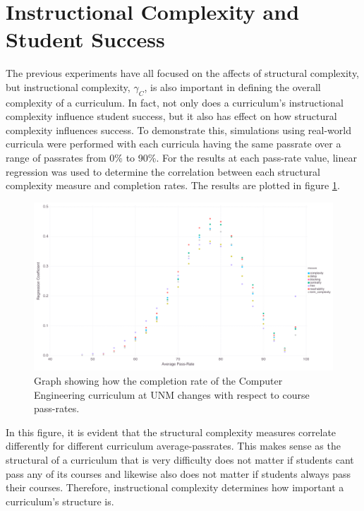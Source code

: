\documentclass[botnum, fleqn]{unmeethesis}
\begin{document}

  \section{Instructional Complexity and Student Success}
    The previous experiments have all focused on the affects of structural complexity, but instructional complexity, $\gamma_C$, is also important in defining the overall complexity of a curriculum. In fact, not only does a curriculum's instructional complexity influence student success, but it also has effect on how structural complexity influences success. To demonstrate this, simulations using real-world curricula were performed with each curricula having the same passrate over a range of passrates from 0\% to 90\%. For the results at each pass-rate value, linear regression was used to determine the correlation between each structural complexity measure and completion rates. The results are plotted in figure \ref{fig:coef}.

    \begin{figure}[h!]
      \centerline{\includegraphics[scale=0.2]{./figures/coef_gradRate10.png}}
      \caption{Graph showing how the completion rate of the Computer Engineering curriculum at UNM changes with respect to course pass-rates.} 
      \label{fig:coef}
    \end{figure}

    In this figure, it is evident that the structural complexity measures correlate differently for different curriculum average-passrates. This makes sense as the structural of a curriculum that is very difficulty does not matter if students cant pass any of its courses and likewise also does not matter if students always pass their courses. Therefore, instructional complexity determines how important a curriculum's structure is.
\end{document}
